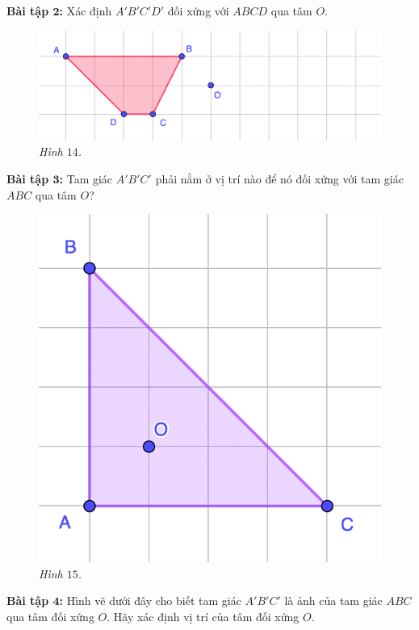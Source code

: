 \begin{multicols}{2}
	\textbf{\color{toancuabi}Bài tập $\pmb2$:} Xác định $A'B'C'D'$ đối xứng với $ABCD$ qua tâm $O$.
	\begin{figure}[H]
		\vspace*{-5pt}
		\centering
		\captionsetup{labelformat= empty, justification=centering}
		\includegraphics[width= 1\linewidth]{14}
		\caption{\small\textit{\color{toancuabi}Hình $14$.}}
		\vspace*{-10pt}
	\end{figure}
	\textbf{\color{toancuabi}Bài tập $\pmb3$:} Tam giác $A'B'C'$ phải nằm ở vị trí nào để nó đối xứng với tam giác $ABC$ qua tâm $O$?
	\begin{figure}[H]
		\vspace*{5pt}
		\centering
		\captionsetup{labelformat= empty, justification=centering}
		\includegraphics[width= 0.54\linewidth]{15}
		\caption{\small\textit{\color{toancuabi}Hình $15$.}}
		\vspace*{-10pt}
	\end{figure}
	\textbf{\color{toancuabi}Bài tập $\pmb4$:} Hình vẽ dưới đây cho biết tam giác $A'B'C'$ là ảnh của tam giác $ABC$ qua tâm đối xứng $O$. Hãy xác định vị trí của tâm đối xứng $O$.
	\begin{figure}[H]
		\vspace*{-5pt}
		\centering
		\captionsetup{labelformat= empty, justification=centering}

\end{figure}
\end{multicols}
